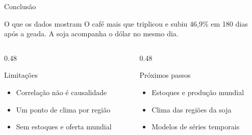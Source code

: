 \documentclass{beamer}
\begin{document}
\begin{frame}{Conclusão}
    \begin{block}{O que os dados mostram}
        O café mais que triplicou e subiu 46,9\% em 180 dias após a geada. A soja acompanha o dólar no mesmo dia.
    \end{block}

    \begin{columns}[T,onlytextwidth]
        \begin{column}{0.48\textwidth}
            \begin{alertblock}{Limitações}
                \footnotesize
                \begin{itemize}
                    \item Correlação não é causalidade
                    \item Um ponto de clima por região
                    \item Sem estoques e oferta mundial
                \end{itemize}
            \end{alertblock}
        \end{column}
        \begin{column}{0.48\textwidth}
            \begin{exampleblock}{Próximos passos}
                \footnotesize
                \begin{itemize}
                    \item Estoques e produção mundial
                    \item Clima das regiões da soja
                    \item Modelos de séries temporais
                \end{itemize}
            \end{exampleblock}
        \end{column}
    \end{columns}
\end{frame}

\end{document}
